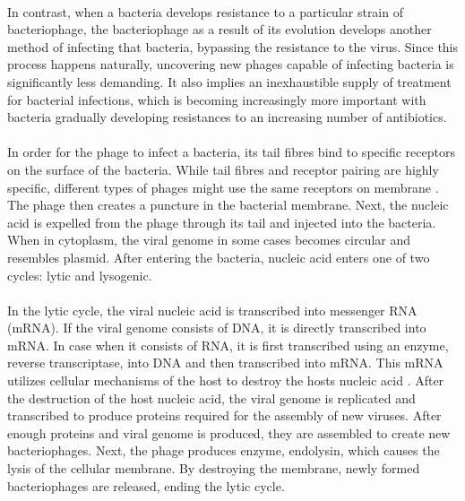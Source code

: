 \paragraph*{}
In contrast, when a bacteria develops resistance to a particular strain of bacteriophage, the bacteriophage as a result of its evolution develops another method of infecting that bacteria, bypassing the resistance to the virus. Since this process happens naturally, uncovering new phages capable of infecting bacteria is significantly less demanding. It also implies an inexhaustible supply of treatment for bacterial infections, which is becoming increasingly more important with bacteria gradually developing resistances to an increasing number of antibiotics.
\paragraph*{}
In order for the phage to infect a bacteria, its tail fibres bind to specific receptors on the surface of the bacteria. While tail fibres and receptor pairing are highly specific, different types of phages might use the same receptors on membrane \cite{guttman2005basic}. The phage then creates a puncture in the bacterial membrane. Next, the nucleic acid is expelled from the phage through its tail and injected into the bacteria. When in cytoplasm, the viral genome in some cases becomes circular and resembles plasmid. After entering the bacteria, nucleic acid enters one of two cycles: lytic and lysogenic.
\paragraph*{}
In the lytic cycle, the viral nucleic acid is transcribed into messenger RNA (mRNA). If the viral genome consists of DNA, it is directly transcribed into mRNA. In case when it consists of RNA, it is first transcribed using an enzyme, reverse transcriptase, into DNA and then transcribed into mRNA. This mRNA utilizes cellular mechanisms of the host to destroy the hosts nucleic acid \cite{guttman2005basic}. After the destruction of the host nucleic acid, the viral genome is replicated and transcribed to produce proteins required for the assembly of new viruses. After enough proteins and viral genome is produced, they are assembled to create new bacteriophages. Next, the phage produces enzyme, endolysin, which causes the lysis of the cellular membrane. By destroying the membrane, newly formed bacteriophages are released, ending the lytic cycle.

